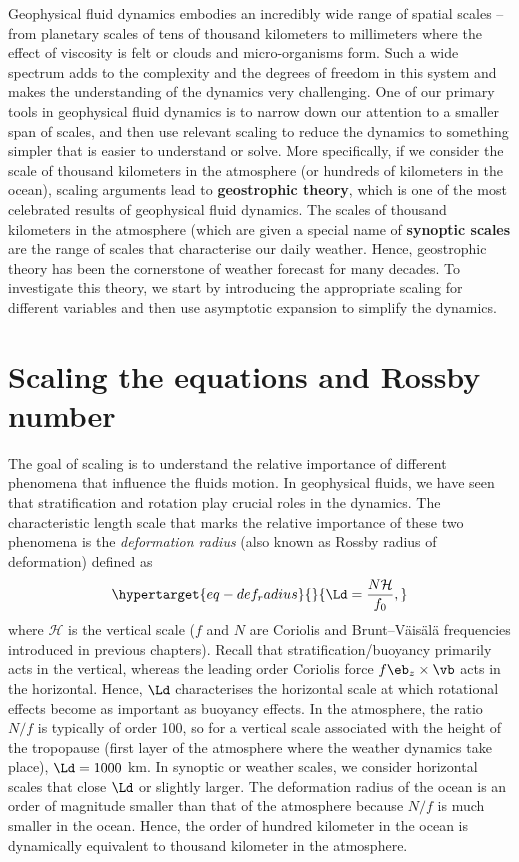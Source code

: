 \documentclass[
  letterpaper,
  twocolumn,
  landscape]{report}
\begin{document}
Geophysical fluid dynamics embodies an incredibly wide range of spatial
scales -- from planetary scales of tens of thousand kilometers to
millimeters where the effect of viscosity is felt or clouds and
micro-organisms form. Such a wide spectrum adds to the complexity and
the degrees of freedom in this system and makes the understanding of the
dynamics very challenging. One of our primary tools in geophysical fluid
dynamics is to narrow down our attention to a smaller span of scales,
and then use relevant scaling to reduce the dynamics to something
simpler that is easier to understand or solve. More specifically, if we
consider the scale of thousand kilometers in the atmosphere (or hundreds
of kilometers in the ocean), scaling arguments lead to
\textbf{geostrophic theory}, which is one of the most celebrated results
of geophysical fluid dynamics. The scales of thousand kilometers in the
atmosphere (which are given a special name of \textbf{synoptic scales}
are the range of scales that characterise our daily weather. Hence,
geostrophic theory has been the cornerstone of weather forecast for many
decades. To investigate this theory, we start by introducing the
appropriate scaling for different variables and then use asymptotic
expansion to simplify the dynamics.

\hypertarget{scaling-the-equations-and-rossby-number}{%
\section{Scaling the equations and Rossby
number}\label{scaling-the-equations-and-rossby-number}}

The goal of scaling is to understand the relative importance of
different phenomena that influence the fluids motion. In geophysical
fluids, we have seen that stratification and rotation play crucial roles
in the dynamics. The characteristic length scale that marks the relative
importance of these two phenomena is the \emph{deformation radius} (also
known as Rossby radius of deformation) defined as
\begin{equation}\protect\hypertarget{eq-def_radius}{}{
    \Ld = \frac{N \mathcal{H}}{f_0},
}\label{eq-def_radius}\end{equation} where \(\mathcal{H}\) is the
vertical scale (\(f\) and \(N\) are Coriolis and Brunt--Väisälä
frequencies introduced in previous chapters). Recall that
stratification/buoyancy primarily acts in the vertical, whereas the
leading order Coriolis force \(f \eb_z \times \vb\) acts in the
horizontal. Hence, \(\Ld\) characterises the horizontal scale at which
rotational effects become as important as buoyancy effects. In the
atmosphere, the ratio \(N/f\) is typically of order 100, so for a
vertical scale associated with the height of the tropopause (first layer
of the atmosphere where the weather dynamics take place), \(\Ld = 1000\)
km. In synoptic or weather scales, we consider horizontal scales that
close \(\Ld\) or slightly larger. The deformation radius of the ocean is
an order of magnitude smaller than that of the atmosphere because
\(N/f\) is much smaller in the ocean. Hence, the order of hundred
kilometer in the ocean is dynamically equivalent to thousand kilometer
in the atmosphere.
\end{document}
